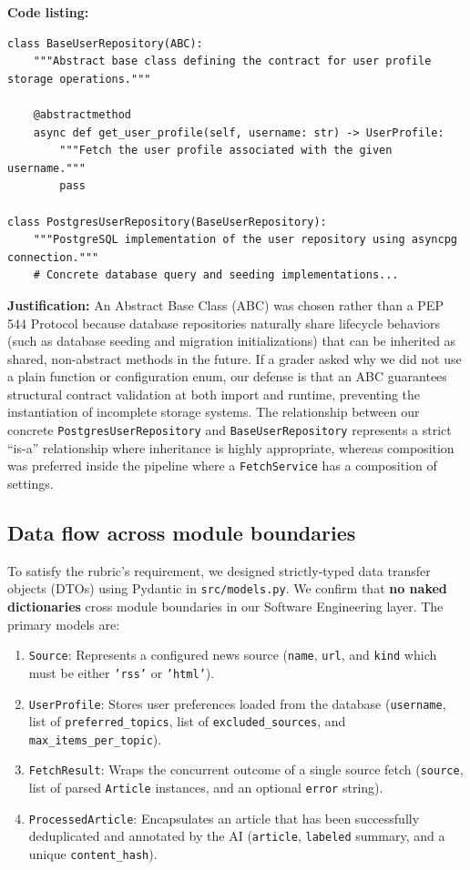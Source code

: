 \documentclass[11pt,a4paper]{article}
\begin{document}
\textbf{Code listing:}
\begin{lstlisting}[style=python]
class BaseUserRepository(ABC):
    """Abstract base class defining the contract for user profile storage operations."""

    @abstractmethod
    async def get_user_profile(self, username: str) -> UserProfile:
        """Fetch the user profile associated with the given username."""
        pass

class PostgresUserRepository(BaseUserRepository):
    """PostgreSQL implementation of the user repository using asyncpg connection."""
    # Concrete database query and seeding implementations...
\end{lstlisting}

\textbf{Justification:}
An Abstract Base Class (ABC) was chosen rather than a PEP 544 Protocol because database repositories naturally share lifecycle behaviors (such as database seeding and migration initializations) that can be inherited as shared, non-abstract methods in the future. If a grader asked why we did not use a plain function or configuration enum, our defense is that an ABC guarantees structural contract validation at both import and runtime, preventing the instantiation of incomplete storage systems. The relationship between our concrete \texttt{PostgresUserRepository} and \texttt{BaseUserRepository} represents a strict ``is-a'' relationship where inheritance is highly appropriate, whereas composition was preferred inside the pipeline where a \texttt{FetchService} has a composition of settings.

\subsection{Data flow across module boundaries}

To satisfy the rubric's requirement, we designed strictly-typed data transfer objects (DTOs) using Pydantic in \texttt{src/models.py}. We confirm that \textbf{no naked dictionaries} cross module boundaries in our Software Engineering layer.
The primary models are:
\begin{enumerate}
    \item \texttt{Source}: Represents a configured news source (\texttt{name}, \texttt{url}, and \texttt{kind} which must be either \texttt{'rss'} or \texttt{'html'}).
    \item \texttt{UserProfile}: Stores user preferences loaded from the database (\texttt{username}, list of \texttt{preferred\_topics}, list of \texttt{excluded\_sources}, and \texttt{max\_items\_per\_topic}).
    \item \texttt{FetchResult}: Wraps the concurrent outcome of a single source fetch (\texttt{source}, list of parsed \texttt{Article} instances, and an optional \texttt{error} string).
    \item \texttt{ProcessedArticle}: Encapsulates an article that has been successfully deduplicated and annotated by the AI (\texttt{article}, \texttt{labeled} summary, and a unique \texttt{content\_hash}).
\end{enumerate}
\end{document}
